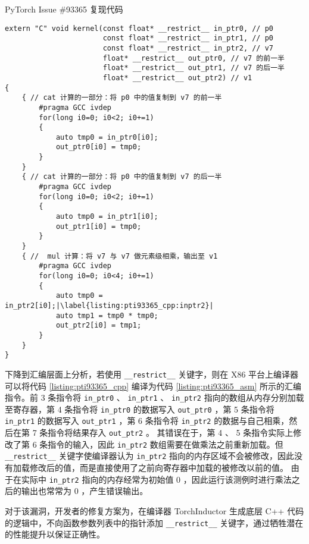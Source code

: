 \begin{listing}[]
    \caption{PyTorch Issue \#93365 复现代码}
    \label{listing:pti93365_cpp}
\begin{verbatim}
extern "C" void kernel(const float* __restrict__ in_ptr0, // p0
                       const float* __restrict__ in_ptr1, // p0
                       const float* __restrict__ in_ptr2, // v7
                       float* __restrict__ out_ptr0, // v7 的前一半
                       float* __restrict__ out_ptr1, // v7 的后一半
                       float* __restrict__ out_ptr2) // v1
{
    { // cat 计算的一部分：将 p0 中的值复制到 v7 的前一半
        #pragma GCC ivdep
        for(long i0=0; i0<2; i0+=1)
        {
            auto tmp0 = in_ptr0[i0];
            out_ptr0[i0] = tmp0;
        }
    }
    { // cat 计算的一部分：将 p0 中的值复制到 v7 的后一半
        #pragma GCC ivdep
        for(long i0=0; i0<2; i0+=1)
        {
            auto tmp0 = in_ptr1[i0];
            out_ptr1[i0] = tmp0;
        }
    }
    { //  mul 计算：将 v7 与 v7 做元素级相乘，输出至 v1
        #pragma GCC ivdep
        for(long i0=0; i0<4; i0+=1)
        {
            auto tmp0 = in_ptr2[i0];|\label{listing:pti93365_cpp:inptr2}|
            auto tmp1 = tmp0 * tmp0;
            out_ptr2[i0] = tmp1;
        }
    }
}
\end{verbatim}
\end{listing}

下降到汇编层面上分析，若使用 \texttt{\_\_restrict\_\_} 关键字，则在 X86 平台上编译器可以将代码 \ref{listing:pti93365_cpp} 编译为代码 \ref{listing:pti93365_asm} 所示的汇编指令。前 3 条指令将 \texttt{in\_ptr0} 、 \texttt{in\_ptr1} 、 \texttt{in\_ptr2} 指向的数组从内存分别加载至寄存器，第 4 条指令将 \texttt{in\_ptr0} 的数据写入 \texttt{out\_ptr0} ，第 5 条指令将 \texttt{in\_ptr1} 的数据写入 \texttt{out\_ptr1} ，第 6 条指令将 \texttt{in\_ptr2} 的数据与自己相乘，然后在第 7 条指令将结果存入 \texttt{out\_ptr2} 。
其错误在于，第 4 、 5 条指令实际上修改了第 6 条指令的输入，因此 \texttt{in\_ptr2} 数组需要在做乘法之前重新加载。但 \texttt{\_\_restrict\_\_} 关键字使编译器认为 \texttt{in\_ptr2} 指向的内存区域不会被修改，因此没有加载修改后的值，而是直接使用了之前向寄存器中加载的被修改以前的值。
由于在实际中 \texttt{in\_ptr2} 指向的内存经常为初始值 0 ，因此运行该测例时进行乘法之后的输出也常常为 0 ，产生错误输出。

对于该漏洞，开发者的修复方案为，在编译器 TorchInductor 生成底层 C++ 代码的逻辑中，不向函数参数列表中的指针添加 \texttt{\_\_restrict\_\_} 关键字，通过牺牲潜在的性能提升以保证正确性。

